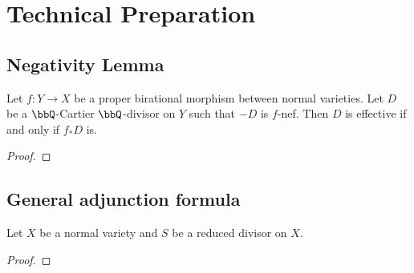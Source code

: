 \section{Technical Preparation}

\subsection{Negativity Lemma}

    \begin{theorem}\label{thm:negativity_lemma}
        Let \(f: Y \to X\) be a proper birational morphism between normal varieties.
        Let \(D\) be a \(\bbQ\)-Cartier \(\bbQ\)-divisor on \(Y\) such that \(-D\) is \(f\)-nef.
        Then \(D\) is effective if and only if \(f_*D\) is.
    \end{theorem}
    \begin{proof}
    \end{proof}

\subsection{General adjunction formula}

    \begin{theorem}\label{thm:general_adjuction_formula}
        Let \(X\) be a normal variety and \(S\) be a reduced divisor on \(X\).
    \end{theorem}
    \begin{proof}
    \end{proof}
